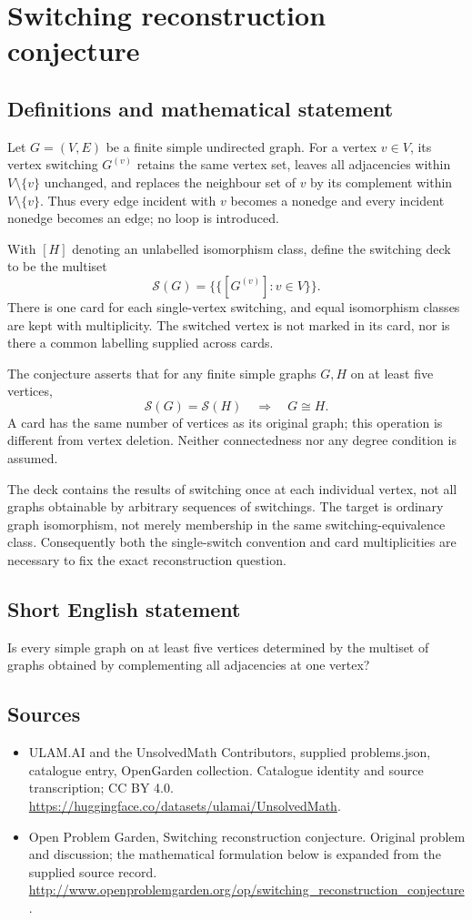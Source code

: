 \documentclass[11pt,a4paper]{article}
\begin{document}
\section*{Switching reconstruction conjecture}\label{statement}

\subsection{Definitions and mathematical statement}
Let $G=(V,E)$ be a finite simple undirected graph. For a vertex $v\in V$,
its vertex switching $G^{(v)}$ retains the same vertex set, leaves all
adjacencies within $V\setminus\{v\}$ unchanged, and replaces the neighbour
set of $v$ by its complement within $V\setminus\{v\}$. Thus every edge
incident with $v$ becomes a nonedge and every incident nonedge becomes
an edge; no loop is introduced.

With $[H]$ denoting an unlabelled isomorphism class, define the switching
deck to be the multiset
\[
 \mathcal S(G)=\{\!\{[G^{(v)}]:v\in V\}\!\}.
\]
There is one card for each single-vertex switching, and equal isomorphism
classes are kept with multiplicity. The switched vertex is not marked
in its card, nor is there a common labelling supplied across cards.

The conjecture asserts that for any finite simple graphs $G,H$ on
at least five vertices,
\[
 \mathcal S(G)=\mathcal S(H)\quad\Longrightarrow\quad G\cong H.
\]
A card has the same number of vertices as its original graph; this
operation is different from vertex deletion. Neither connectedness nor
any degree condition is assumed.

The deck contains the results of switching once at each individual
vertex, not all graphs obtainable by arbitrary sequences of switchings.
The target is ordinary graph isomorphism, not merely membership in the
same switching-equivalence class. Consequently both the single-switch
convention and card multiplicities are necessary to fix the exact
reconstruction question.
\subsection{Short English statement}
Is every simple graph on at least five vertices determined by the multiset of graphs obtained by complementing all adjacencies at one vertex?
\subsection{Sources}
\begin{itemize}
\item[S1] ULAM.AI and the UnsolvedMath Contributors, supplied problems.json, catalogue entry, OpenGarden collection. Catalogue identity and source transcription; CC BY 4.0.
\url{https://huggingface.co/datasets/ulamai/UnsolvedMath}.
\item[S2] Open Problem Garden, Switching reconstruction conjecture. Original problem and discussion; the mathematical formulation below is expanded from the supplied source record.
\url{http://www.openproblemgarden.org/op/switching_reconstruction_conjecture}.
\end{itemize}
\end{document}
